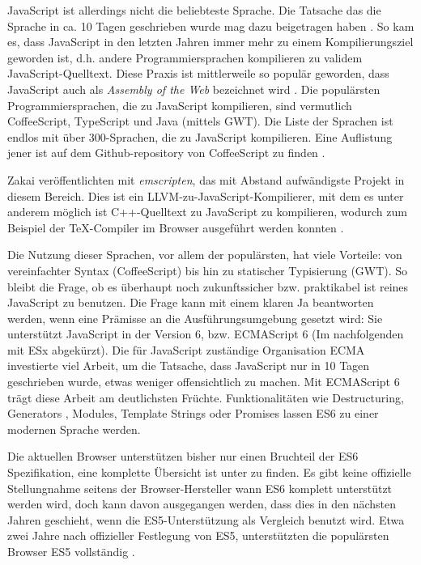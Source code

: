 \documentclass[12pt,twoside]{book}
\begin{document}
JavaScript ist allerdings nicht die beliebteste Sprache. Die Tatsache das die Sprache in ca. 10 Tagen geschrieben wurde mag dazu beigetragen haben \citep{severance2012javascript}. So kam es, dass JavaScript in den letzten Jahren immer mehr zu einem Kompilierungsziel geworden ist, d.h. andere Programmiersprachen kompilieren zu validem JavaScript-Quelltext. Diese Praxis ist mittlerweile so populär geworden, dass JavaScript auch als \textit{Assembly of the Web} bezeichnet wird \cite{webassembly}. Die populärsten Programmiersprachen, die zu JavaScript kompilieren, sind vermutlich CoffeeScript, TypeScript und Java (mittels GWT). Die Liste der Sprachen ist endlos mit über 300-Sprachen, die zu JavaScript kompilieren. Eine Auflistung jener ist auf dem Github-repository von CoffeeScript zu finden \cite{javascriptcompile}.

Zakai \citep{zakai2011emscripten} veröffentlichten mit \textit{emscripten}, das mit Abstand aufwändigste Projekt in diesem Bereich. Dies ist ein LLVM-zu-JavaScript-Kompilierer, mit dem es unter anderem möglich ist C++-Quelltext zu JavaScript zu kompilieren, wodurch zum Beispiel der TeX-Compiler im Browser ausgeführt werden konnten \cite{texlive}.

Die Nutzung dieser Sprachen, vor allem der populärsten, hat viele Vorteile: von vereinfachter Syntax (CoffeeScript) bis hin zu statischer Typisierung (GWT). So bleibt die Frage, ob es überhaupt noch zukunftssicher bzw. praktikabel ist reines JavaScript zu benutzen.
Die Frage kann mit einem klaren Ja beantworten werden, wenn eine Prämisse an die Ausführungsumgebung gesetzt wird: Sie unterstützt JavaScript in der Version 6, bzw. ECMAScript 6 (Im nachfolgenden mit ESx abgekürzt).
Die für JavaScript zuständige Organisation ECMA investierte viel Arbeit, um die Tatsache, dass JavaScript nur in 10 Tagen geschrieben wurde, etwas weniger offensichtlich zu machen. Mit ECMAScript 6 \cite{es6} trägt diese Arbeit am deutlichsten Früchte. Funktionalitäten wie Destructuring, Generators , Modules, Template Strings oder Promises lassen ES6 zu einer modernen Sprache werden.

Die aktuellen Browser unterstützen bisher nur einen Bruchteil der ES6 Spezifikation, eine komplette Übersicht ist unter \cite{es6features} zu finden. Es gibt keine offizielle Stellungnahme seitens der Browser-Hersteller wann ES6 komplett unterstützt werden wird, doch kann davon ausgegangen werden, dass dies in den nächsten Jahren geschieht, wenn die ES5-Unterstützung als Vergleich benutzt wird. Etwa zwei Jahre nach offizieller Festlegung von ES5, unterstützten die populärsten Browser ES5 vollständig \cite{es5adoption}.
\end{document}
